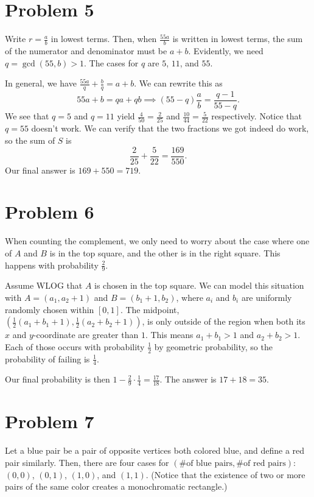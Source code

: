 \documentclass{scrartcl}
\begin{document}
\section*{Problem 5}
Write $r=\frac{a}{b}$ in lowest terms.
Then, when $\frac{55a}{b}$ is written in lowest terms,
the sum of the numerator and denominator must be $a+b$.
Evidently, we need $q= \gcd(55,b) > 1$.
The cases for $q$ are $5$, $11$, and $55$.

In general, we have $\frac{55a}{q} + \frac{b}{q} = a+b$.
We can rewrite this as
\[ 55a + b = qa + qb \implies (55-q)\frac{a}{b} = \frac{q-1}{55-q}. \]
We see that $q=5$ and $q=11$ yield $\frac{4}{50} = \frac{2}{25}$ and $\frac{10}{44} = \frac{5}{22}$
respectively.
Notice that $q=55$ doesn't work.
We can verify that the two fractions we got indeed do work, so the sum of $S$ is
\[ \frac{2}{25} + \frac{5}{22} = \frac{169}{550}. \]
Our final answer is $169 + 550 = \boxed{719}$.

\section*{Problem 6}
When counting the complement,
we only need to worry about the case where one of $A$ and $B$ is in the top square,
and the other is in the right square.
This happens with probability $\frac{2}{9}$.

Assume WLOG that $A$ is chosen in the top square.
We can model this situation with $A = (a_1, a_2 + 1)$ and $B = (b_1 + 1, b_2)$,
where $a_i$ and $b_i$ are uniformly randomly chosen within $[0,1]$.
The midpoint, $\left(\frac12 (a_1 + b_1 + 1),\frac12 (a_2 + b_2 + 1)\right)$,
is only outside of the region
when both its $x$ and $y$-coordinate are greater than $1$.
This means $a_1 + b_1 > 1$ and $a_2 + b_2 > 1$.
Each of those occurs with probability $\frac12$ by geometric probability,
so the probability of failing is $\frac14$.

Our final probability is then $1 - \frac29 \cdot \frac14 = \frac{17}{18}$.
The answer is $17 + 18 = \boxed{35}$.

\section*{Problem 7}
Let a blue pair be a pair of opposite vertices both colored blue, and define a red pair similarly.
Then, there are four cases for $(\text{\# of blue pairs}, \text{\# of red pairs})$: $(0,0)$, $(0,1)$, $(1,0)$,
and $(1,1)$.
(Notice that the existence of two or more pairs of the same color creates a monochromatic rectangle.)
\end{document}
